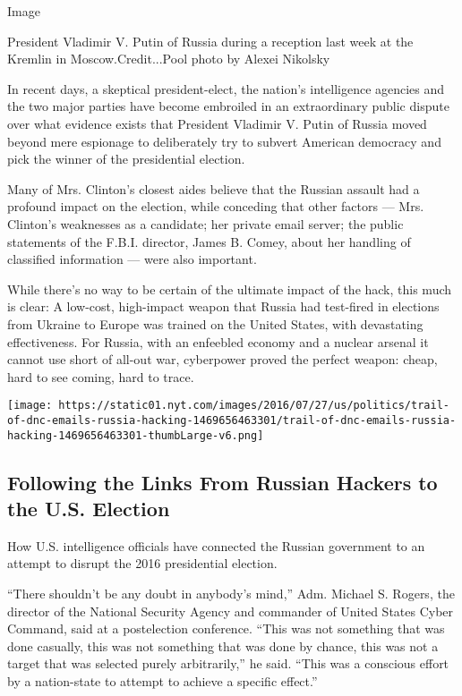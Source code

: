 Image

President Vladimir V. Putin of Russia during a reception last week at
the Kremlin in Moscow.Credit...Pool photo by Alexei Nikolsky

In recent days, a skeptical president-elect, the nation's intelligence
agencies and the two major parties have become embroiled in an
extraordinary public dispute over what evidence exists that President
Vladimir V. Putin of Russia moved beyond mere espionage to deliberately
try to subvert American democracy and pick the winner of the
presidential election.

Many of Mrs. Clinton's closest aides believe that the Russian assault
had a profound impact on the election, while conceding that other
factors --- Mrs. Clinton's weaknesses as a candidate; her private email
server; the public statements of the F.B.I. director, James B. Comey,
about her handling of classified information --- were also important.

While there's no way to be certain of the ultimate impact of the hack,
this much is clear: A low-cost, high-impact weapon that Russia had
test-fired in elections from Ukraine to Europe was trained on the United
States, with devastating effectiveness. For Russia, with an enfeebled
economy and a nuclear arsenal it cannot use short of all-out war,
cyberpower proved the perfect weapon: cheap, hard to see coming, hard to
trace.

\href{https://www.nytimes.com/interactive/2016/07/27/us/politics/trail-of-dnc-emails-russia-hacking.html}{}

\texttt{[image: https://static01.nyt.com/images/2016/07/27/us/politics/trail-of-dnc-emails-russia-hacking-1469656463301/trail-of-dnc-emails-russia-hacking-1469656463301-thumbLarge-v6.png]}

\hypertarget{following-the-links-from-russian-hackers-to-the-us-election}{%
\subsection{Following the Links From Russian Hackers to the U.S.
Election}\label{following-the-links-from-russian-hackers-to-the-us-election}}

How U.S. intelligence officials have connected the Russian government to
an attempt to disrupt the 2016 presidential election.

``There shouldn't be any doubt in anybody's mind,'' Adm. Michael S.
Rogers, the director of the National Security Agency and commander of
United States Cyber Command, said at a postelection conference. ``This
was not something that was done casually, this was not something that
was done by chance, this was not a target that was selected purely
arbitrarily,'' he said. ``This was a conscious effort by a nation-state
to attempt to achieve a specific effect.''

